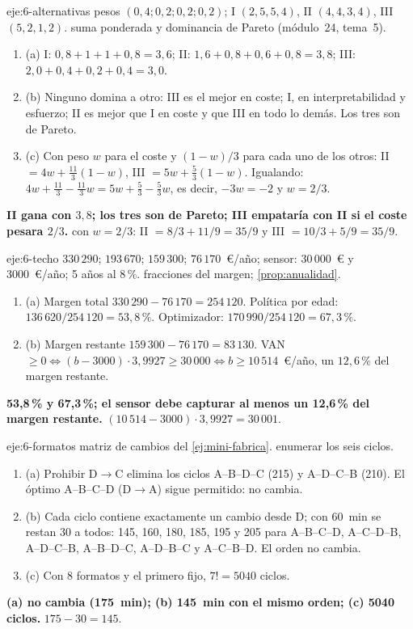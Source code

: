 \begin{solucion}{eje:6-alternativas}
\datos pesos $(0{,}4;0{,}2;0{,}2;0{,}2)$; I $(2,5,5,4)$, II $(4,4,3,4)$, III $(5,2,1,2)$.
\planteamiento suma ponderada y dominancia de Pareto (módulo~24, tema~5).
\pasos
\begin{enumerate}[label=\arabic*.]
  \item (a) I: $0{,}8+1+1+0{,}8=3{,}6$; II: $1{,}6+0{,}8+0{,}6+0{,}8=3{,}8$; III: $2{,}0+0{,}4+0{,}2+0{,}4=3{,}0$.
  \item (b) Ninguno domina a otro: III es el mejor en coste; I, en interpretabilidad y esfuerzo; II es mejor que I en coste y que III en todo lo demás. Los tres son de Pareto.
  \item (c) Con peso $w$ para el coste y $(1-w)/3$ para cada uno de los otros: II $=4w+\frac{11}{3}(1-w)$, III $=5w+\frac53(1-w)$. Igualando: $4w+\frac{11}3-\frac{11}3w=5w+\frac53-\frac53w$, es decir, $-3w=-2$ y $w=2/3$.
\end{enumerate}
\resultado \textbf{II gana con $3{,}8$; los tres son de Pareto; III empataría con II si el coste pesara $2/3$.}
\comprobacion con $w=2/3$: II $=8/3+11/9=35/9$ y III $=10/3+5/9=35/9$.
\end{solucion}

\begin{solucion}{eje:6-techo}
\datos $330\,290$; $193\,670$; $159\,300$; $76\,170$~€/año; sensor: 30\,000~€ y 3000~€/año; 5 años al 8\,\%.
\planteamiento fracciones del margen; \cref{prop:anualidad}.
\pasos
\begin{enumerate}[label=\arabic*.]
  \item (a) Margen total $330\,290-76\,170=254\,120$. Política por edad: $136\,620/254\,120=53{,}8\,\%$. Optimizador: $170\,990/254\,120=67{,}3\,\%$.
  \item (b) Margen restante $159\,300-76\,170=83\,130$. VAN $\ge0\iff(b-3000)\cdot3{,}9927\ge30\,000\iff b\ge10\,514$~€/año, un $12{,}6\,\%$ del margen restante.
\end{enumerate}
\resultado \textbf{53{,}8\,\% y 67{,}3\,\%; el sensor debe capturar al menos un 12{,}6\,\% del margen restante.}
\comprobacion $(10\,514-3000)\cdot3{,}9927=30\,001$.
\end{solucion}

\begin{solucion}{eje:6-formatos}
\datos matriz de cambios del \cref{ej:mini-fabrica}.
\planteamiento enumerar los seis ciclos.
\pasos
\begin{enumerate}[label=\arabic*.]
  \item (a) Prohibir D$\to$C elimina los ciclos A--B--D--C (215) y A--D--C--B (210). El óptimo A--B--C--D (D$\to$A) sigue permitido: no cambia.
  \item (b) Cada ciclo contiene exactamente un cambio desde D; con 60~min se restan 30 a todos: 145, 160, 180, 185, 195 y 205 para A--B--C--D, A--C--D--B, A--D--C--B, A--B--D--C, A--D--B--C y A--C--B--D. El orden no cambia.
  \item (c) Con 8 formatos y el primero fijo, $7!=5040$ ciclos.
\end{enumerate}
\resultado \textbf{(a) no cambia (175~min); (b) 145~min con el mismo orden; (c) 5040 ciclos.}
\comprobacion $175-30=145$.
\end{solucion}

